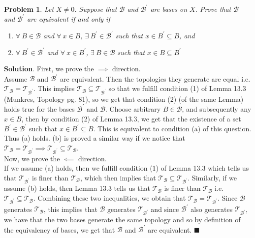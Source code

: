 \documentclass[12pt]{article}
\renewcommand{\=}[1]{\stackrel{#1}{=}} %
\providecommand{\T}{\mathcal{T}}
\newtheorem{p}{Problem}[section]
\theoremstyle{definition}
\newenvironment{s}{%
        \begin{trivlist} \item \textbf{Solution}. }{%
            \hspace*{\fill} $\blacksquare$\end{trivlist}}%
\begin{document}
\begin{p}
    Let $X\neq 0$. Suppose that $\mathcal{B}$ and $\mathcal{B}^{'}$ are bases on $X$. Prove that $\mathcal{B}$ and $\mathcal{B}^{'}$
    are equivalent if and only if
    \begin{enumerate}
        \item[(a)] $\forall\: B\in\mathcal{B}$ and $\forall\:x\in B$, $\exists\:B^{'}\in\mathcal{B}^{'}$ such that $x\in B^{'}\subseteq B$, and
        \item[(b)] $\forall\: B^{'}\in\mathcal{B}^{'}$ and $\forall\:x\in B^{'}$, $\exists\:B\in\mathcal{B}$ such that $x\in B\subseteq B^{'}$
    \end{enumerate}
\end{p}
\begin{s}
    First, we prove the $\implies$ direction.\\
    Assume $\mathcal{B}$ and $\mathcal{B}^{'}$ are equivalent. Then the topologies they generate are equal i.e. $\T_{\mathcal{B}} = 
    \T_{\mathcal{B}^{'}}$. This implies $\T_{\mathcal{B}} \subseteq \T_{\mathcal{B}^{'}}$ so that we fulfill condition (1) of
    Lemma 13.3 (Munkres, Topology pg. 81), so we get that condition (2) (of the same Lemma) holds true for the bases $\mathcal{B}^{'}$ and
    $\mathcal{B}$. Choose arbitrary $B\in\mathcal{B}$, and subsequently any $x\in B$, then by condition (2) of Lemma 13.3, we get that
    the existence of a set $B^{'}\in\mathcal{B}^{'}$ such that $x\in B^{'}\subseteq B$. This is equivalent to condition (a) of this question.
    Thus (a) holds. (b) is proved a similar way if we notice that $\T_{\mathcal{B}} = \T_{\mathcal{B}^{'}} \implies \T_{\mathcal{B}^{'}} \subseteq
    \T_{\mathcal{B}}$.\\
    Now, we prove the $\impliedby$ direction.\\
    If we assume (a) holds, then we fulfill condition (1) of Lemma 13.3 which tells us that $\T_{\mathcal{B}^{'}}$ is finer than $\T_{\mathcal{B}}$, 
    which then implies that $\T_{\mathcal{B}} \subseteq \T_{\mathcal{B}^{'}}$. 
    Similarly, if we assume (b) holds, then Lemma 13.3 tells us that $\T_{\mathcal{B}}$ is finer than $\T_{\mathcal{B}}$ 
    i.e. $\T_{\mathcal{B}^{'}} \subseteq \T_{\mathcal{B}}$.
    Combining these two inequalities, we obtain that $\T_{\mathcal{B}} = \T_{\mathcal{B}^{'}}$. Since $\mathcal{B}$ generates $\T_{\mathcal{B}}$,
    this implies that $\mathcal{B}$ generates
    $\T_{\mathcal{B}^{'}}$ and since $\mathcal{B}^{'}$ also generates $\T_{\mathcal{B}^{'}}$, we have that the two bases generate the same topology
    and so by definition of the equivalency of bases, we get that $\mathcal{B}$ and $\mathcal{B}^{'}$ are equivalent.
\end{s}
\end{document}
